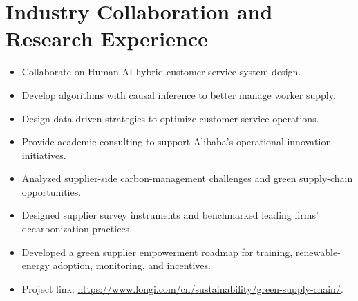 \section*{Industry Collaboration and Research Experience}

\begin{itemize}[leftmargin=1.2em]
  \cvitemsep
  \item Collaborate on Human-AI hybrid customer service system design.
  \item Develop algorithms with causal inference to better manage worker supply.
  \item Design data-driven strategies to optimize customer service operations.
  \item Provide academic consulting to support Alibaba's operational innovation initiatives.
\end{itemize}

\begin{itemize}[leftmargin=1.2em]
  \cvitemsep
  \item Analyzed supplier-side carbon-management challenges and green supply-chain opportunities.
  \item Designed supplier survey instruments and benchmarked leading firms' decarbonization practices.
  \item Developed a green supplier empowerment roadmap for training, renewable-energy adoption, monitoring, and incentives.
  \item Project link: \url{https://www.longi.com/cn/sustainability/green-supply-chain/}.
\end{itemize}
